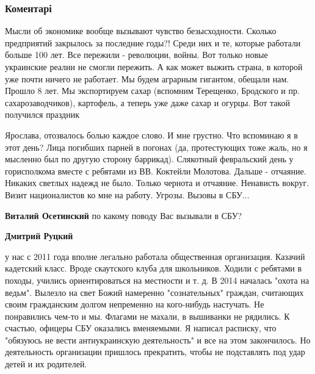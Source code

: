  
 
 
 
 
\subsubsection{Коментарі}
\label{sec:22_11_2021.fb.zolotjko_jaroslava.kiev.zhurnalist.1.mysli_o_evromaidane.cmt}

\begin{itemize} %

Мысли об экономике вообще вызывают чувство безысходности. Сколько предприятий
закрылось за последние годы?! Среди них и те, которые работали больше 100 лет.
Все пережили - революции, войны. Вот только новые украинские реалии не смогли
пережить. А как может выжить страна, в которой уже почти ничего не работает. Мы
будем аграрным гигантом, обещали нам. Прошло 8 лет. Мы экспортируем сахар
(вспомним Терещенко, Бродского и пр. сахарозаводчиков), картофель, а теперь уже
даже сахар и огурцы. Вот такой получился праздник


Ярослава, отозвалось болью каждое слово. И мне грустно. Что вспоминаю я в этот
день? Лица погибших парней в погонах (да, протестующих тоже жаль, но я мысленно
был по другую сторону баррикад). Слякотный февральский день у горисполкома
вместе с ребятами из ВВ. Коктейли Молотова. Дальше - отчаяние. Никаких светлых
надежд не было. Только чернота и отчаяние. Ненависть вокруг. Визит
националистов ко мне на работу. Угрозы. Вызовы в СБУ...

\begin{itemize} %
\textbf{Виталий Осетинский} по какому поводу Вас вызывали в СБУ?

\textbf{Дмитрий Руцкий} 

у нас с 2011 года вполне легально работала общественная организация. Казачий
кадетский класс. Вроде скаутского клуба для школьников. Ходили с ребятами в
походы, учились ориентироваться на местности и т. д. В 2014 началась "охота на
ведьм". Вылезло на свет Божий намеренно "сознательных" граждан, считающих своим
гражданским долгом непременно на кого-нибудь настучать. Не понравились чем-то и
мы. Флагами не махали, в вышиванки не рядились. К счастью, офицеры СБУ
оказались вменяемыми. Я написал расписку, что "обязуюсь не вести антиукраинскую
деятельность" и все на этом закончилось. Но деятельность организации пришлось
прекратить, чтобы не подставлять под удар детей и их родителей.


\end{itemize}
\end{itemize}
